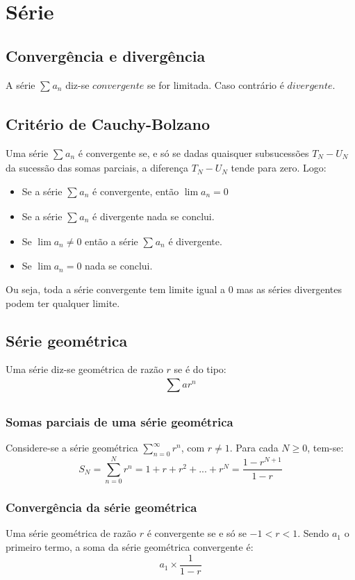\documentclass[10pt,a4paper]{report}
\begin{document}
\chapter{Série}

\section{Convergência e divergência}
A série $\sum_{}^{} a_{n}$ diz-se $convergente$ se for limitada. Caso contrário é $divergente$.

\section{Critério de Cauchy-Bolzano}
Uma série $\sum_{}^{} a_n$ é convergente se, e só se dadas quaisquer subsucessões $T_N - U_N$ da sucessão
das somas parciais, a diferença $T_N - U_N$ tende para zero. Logo:
\begin{itemize}
\item Se a série $\sum_{}^{} a_n$ é convergente, então $\lim a_n = 0$
\item Se a série $\sum_{}^{} a_n$ é divergente nada se conclui.
\item Se $\lim a_n \neq 0$ então a série $\sum_{}^{} a_n$ é divergente.
\item Se $\lim a_n = 0$ nada se conclui.
\end{itemize}
Ou seja, toda a série convergente tem limite igual a 0 mas as séries divergentes podem ter qualquer limite.

\section{Série geométrica}
Uma série diz-se geométrica de razão $r$ se é do tipo:
$$
\sum_{}^{} ar^{n}
$$
\subsection{Somas parciais de uma série geométrica}
Considere-se a série geométrica $\sum_{n=0}^{\infty} r^{n}$, com $r \neq 1$. Para cada $N \geq 0$, tem-se:
$$
S_N = \sum_{n=0}^{N} r^{n} = 1 + r + r^2 + ... + r^N = \frac{1-r^{N+1}}{1-r}
$$
\subsection{Convergência da série geométrica}
Uma série geométrica de razão $r$ é convergente se e só se $-1 < r < 1$. Sendo $a_1$ o primeiro termo, a soma da série geométrica convergente é:
$$
a_1 \times \frac{1}{1-r}
$$
\end{document}
